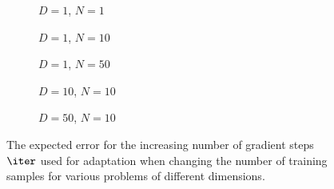 \begin{figure}[!htb]
  \centering
    \begin{subfigure}{0.3\textwidth}
      \centering
      \caption{$D=1$, $N=1$}
      \label{fig:nonlinear-n_iter-N-1-D-1}
    \end{subfigure}
    \begin{subfigure}{0.3\textwidth}
      \centering
      \caption{$D=1$, $N=10$}
      \label{fig:nonlinear-n_iter-N-10-D-1}
    \end{subfigure}
    \begin{subfigure}{0.3\textwidth}
      \centering
      \caption{$D=1$, $N=50$}
      \label{fig:nonlinear-n_iter-N-50-D-1}
    \end{subfigure}

    \begin{subfigure}{0.3\textwidth}
      \centering
      \caption{$D=10$, $N=10$}
      \label{fig:nonlinear-n_iter-N-10-D-10}
    \end{subfigure}
    \begin{subfigure}{0.3\textwidth}
      \centering
      \caption{$D=50$, $N=10$}
      \label{fig:nonlinear-n_iter-N-10-D-50}
    \end{subfigure}  
  \caption{The expected error for the increasing number of gradient steps $\iter$ used for adaptation when changing the number of training samples for various problems of different dimensions.}
  \label{fig:nonlinear-n_iter}
\end{figure}


